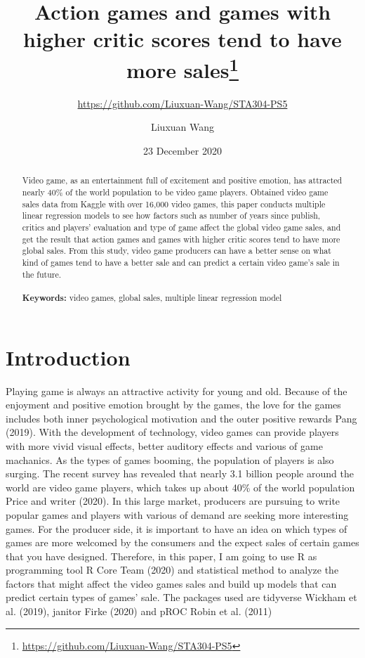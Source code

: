 \documentclass[
]{article}
\title{Action games and games with higher critic scores tend to have more sales\thanks{\url{https://github.com/Liuxuan-Wang/STA304-PS5}}}
\subtitle{\url{https://github.com/Liuxuan-Wang/STA304-PS5}}
\author{Liuxuan Wang}
\date{23 December 2020}
\begin{document}
\maketitle
\begin{abstract}
Video game, as an entertainment full of excitement and positive emotion,
has attracted nearly 40\% of the world population to be video game
players. Obtained video game sales data from Kaggle with over 16,000
video games, this paper conducts multiple linear regression models to
see how factors such as number of years since publish, critics and
players' evaluation and type of game affect the global video game sales,
and get the result that action games and games with higher critic scores
tend to have more global sales. From this study, video game producers
can have a better sense on what kind of games tend to have a better sale
and can predict a certain video game's sale in the future.\\
~\\
\textbf{Keywords:} video games, global sales, multiple linear regression
model
\end{abstract}

\hypertarget{introduction}{%
\section{Introduction}\label{introduction}}

Playing game is always an attractive activity for young and old. Because
of the enjoyment and positive emotion brought by the games, the love for
the games includes both inner psychological motivation and the outer
positive rewards Pang (2019). With the development of technology, video
games can provide players with more vivid visual effects, better
auditory effects and various of game machanics. As the types of games
booming, the population of players is also surging. The recent survey
has revealed that nearly 3.1 billion people around the world are video
game players, which takes up about 40\% of the world population Price
and writer (2020). In this large market, producers are pursuing to write
popular games and players with various of demand are seeking more
interesting games. For the producer side, it is important to have an
idea on which types of games are more welcomed by the consumers and the
expect sales of certain games that you have designed. Therefore, in this
paper, I am going to use R as programming tool R Core Team (2020) and
statistical method to analyze the factors that might affect the video
games sales and build up models that can predict certain types of games'
sale. The packages used are tidyverse Wickham et al. (2019), janitor
Firke (2020) and pROC Robin et al. (2011)
\end{document}
